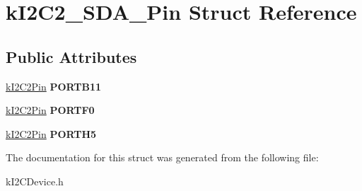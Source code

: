 \hypertarget{structkI2C2__SDA__Pin}{}\section{k\+I2\+C2\+\_\+\+S\+D\+A\+\_\+\+Pin Struct Reference}
\label{structkI2C2__SDA__Pin}
\subsection*{Public Attributes}
\begin{DoxyCompactItemize}
\item 
\hyperlink{structkI2C2Pin}{k\+I2\+C2\+Pin} {\bfseries P\+O\+R\+T\+B11}\hypertarget{structkI2C2__SDA__Pin_a5fff55f4ae1d93b24a3a3cbde8cab051}{}\label{structkI2C2__SDA__Pin_a5fff55f4ae1d93b24a3a3cbde8cab051}

\item 
\hyperlink{structkI2C2Pin}{k\+I2\+C2\+Pin} {\bfseries P\+O\+R\+T\+F0}\hypertarget{structkI2C2__SDA__Pin_aa119d3b0d6c6fefd1e3fb5a3402408d0}{}\label{structkI2C2__SDA__Pin_aa119d3b0d6c6fefd1e3fb5a3402408d0}

\item 
\hyperlink{structkI2C2Pin}{k\+I2\+C2\+Pin} {\bfseries P\+O\+R\+T\+H5}\hypertarget{structkI2C2__SDA__Pin_a82f154f9dfe4bf0b9d5f089e51ae59de}{}\label{structkI2C2__SDA__Pin_a82f154f9dfe4bf0b9d5f089e51ae59de}

\end{DoxyCompactItemize}


The documentation for this struct was generated from the following file\+:\begin{DoxyCompactItemize}
\item 
k\+I2\+C\+Device.\+h\end{DoxyCompactItemize}
